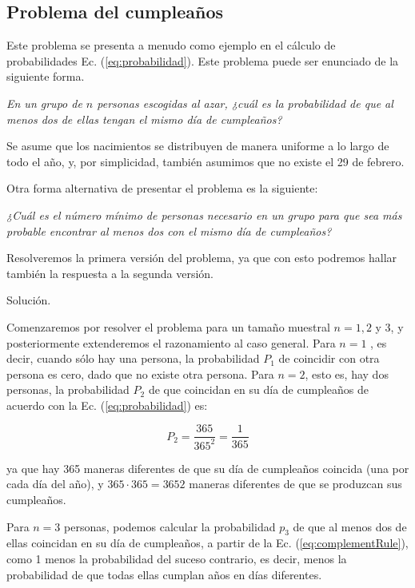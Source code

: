 
\subsection{Problema del cumpleaños}

Este problema se presenta a menudo como ejemplo en el c\'alculo de
probabilidades Ec. (\ref{eq:probabilidad}). Este problema puede ser enunciado de la siguiente
forma. 

\textit{En un grupo de $n$ personas escogidas al azar, ¿cuál es la probabilidad de que
al menos dos de ellas tengan el mismo d\'ia de cumpleaños?}

Se asume que los nacimientos se distribuyen de manera uniforme a lo largo de
todo el año, y, por simplicidad, también asumimos que no existe el 29 de
febrero.

Otra forma alternativa de presentar el problema es la siguiente:

\textit{¿Cuál es el número mínimo de personas necesario en un grupo para que sea más
probable encontrar al menos dos con el mismo d\'ia de cumpleaños?}

Resolveremos la primera versión del problema, ya que con esto podremos hallar
también la respuesta a la segunda versión.

Soluci\'on.

Comenzaremos por resolver el problema para un tamaño muestral $n = 1, 2$ y $3$,
y posteriormente extenderemos el razonamiento al caso general. Para $n = 1$ , es
decir, cuando s\'olo hay una persona, la probabilidad $P_1$ de coincidir con otra
persona es cero, dado que no existe otra persona. Para $n = 2$, esto es, hay dos
personas, la probabilidad $P_2$ de que coincidan en su d\'ia de cumpleaños de
acuerdo con la Ec. (\ref{eq:probabilidad}) es:


\begin{equation}
P_2 = \frac{365}{365^2} = \frac{1}{365}
\end{equation}

ya que hay 365 maneras diferentes de que su día de cumpleaños coincida
(una por cada día del año), y $365 \cdot 365 = 3652$ maneras diferentes de que
se produzcan sus cumpleaños.

Para $n = 3$ personas, podemos calcular la probabilidad $p_3$ de que al menos
dos de ellas coincidan en su día de cumpleaños, a partir de la Ec.
(\ref{eq:complementRule}), como 1 menos la probabilidad del suceso contrario, es
decir, menos la probabilidad de que todas ellas cumplan años en d\'ias
diferentes.

